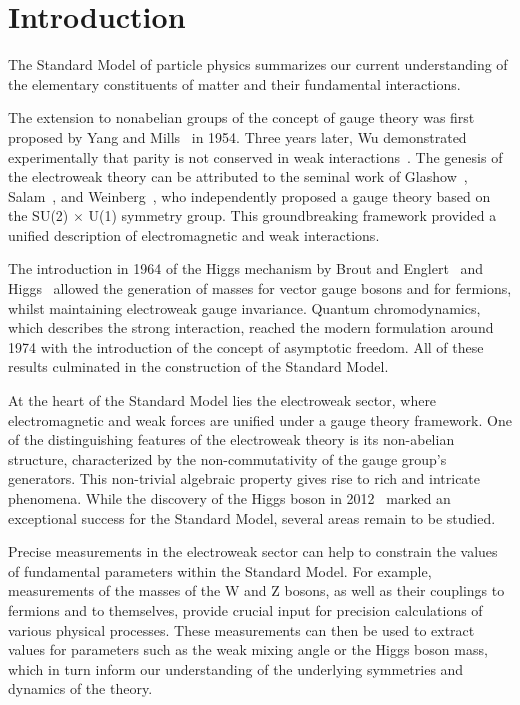 \chapter*{Introduction}

The Standard Model of particle physics summarizes our current understanding
of the elementary constituents of matter and their fundamental interactions.

The extension to nonabelian groups of the concept of gauge theory was first proposed
by Yang and Mills~\cite{PhysRev.96.191} in 1954.
Three years later, Wu demonstrated experimentally that parity is not conserved in weak interactions~\cite{PhysRev.105.1413}.
The genesis of the electroweak theory can be attributed to the seminal work of Glashow~\cite{GLASHOW1961579},
Salam~\cite{Salam:1968rm}, and Weinberg~\cite{PhysRevLett.19.1264},
who independently proposed a gauge theory based on the SU(2) $\times$ U(1) symmetry group.
This groundbreaking framework provided a unified description of electromagnetic and weak interactions.

The introduction in 1964 of the Higgs mechanism by Brout and Englert~\cite{PhysRevLett.13.321} and Higgs~\cite{PhysRevLett.13.508, HIGGS1964132}
allowed the generation of masses for vector gauge bosons and for fermions,
whilst maintaining electroweak gauge invariance.
Quantum chromodynamics, which describes the strong interaction, reached the modern formulation
around 1974 with the introduction of the concept of asymptotic freedom.
All of these results culminated in the construction of the Standard Model.

At the heart of the Standard Model lies the electroweak sector,
where electromagnetic and weak forces are unified under a gauge theory framework.
One of the distinguishing features of the electroweak theory is its non-abelian structure,
characterized by the non-commutativity of the gauge group's generators.
This non-trivial algebraic property gives rise to rich and intricate phenomena.
While the discovery of the Higgs boson in 2012~\cite{ATLASHiggsDiscovery, CMS-HIG-12-028}
marked an exceptional success for the Standard Model,
several areas remain to be studied.

Precise measurements in the electroweak sector can help to constrain the values of fundamental parameters within the Standard Model.
For example, measurements of the masses of the W and Z bosons, as well as their couplings to fermions and to themselves,
provide crucial input for precision calculations of various physical processes.
These measurements can then be used to extract values for parameters such as the weak mixing angle or the Higgs boson mass,
which in turn inform our understanding of the underlying symmetries and dynamics of the theory.

